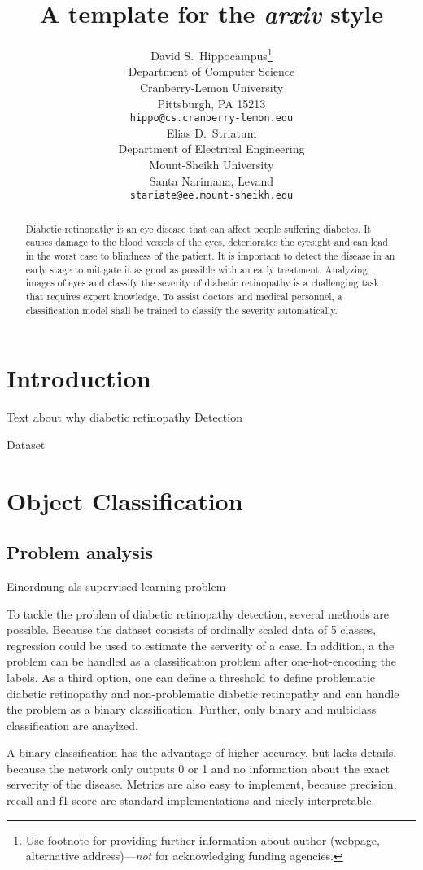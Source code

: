 \documentclass{article}
\title{A template for the \emph{arxiv} style}
\author{
  David S.~Hippocampus\thanks{Use footnote for providing further
    information about author (webpage, alternative
    address)---\emph{not} for acknowledging funding agencies.} \\
  Department of Computer Science\\
  Cranberry-Lemon University\\
  Pittsburgh, PA 15213 \\
  \texttt{hippo@cs.cranberry-lemon.edu} \\
   \And
 Elias D.~Striatum \\
  Department of Electrical Engineering\\
  Mount-Sheikh University\\
  Santa Narimana, Levand \\
  \texttt{stariate@ee.mount-sheikh.edu} \\
}
\begin{document}
\maketitle

\begin{abstract}
Diabetic retinopathy is an eye disease that can affect people suffering diabetes. It causes damage to the blood vessels of 
the eyes, deteriorates the eyesight and can lead in the worst case to blindness of the patient. It is important to 
detect the disease in an early stage to mitigate it as good as possible with an early treatment. Analyzing images of 
eyes and classify the severity of diabetic retinopathy is a challenging task that requires expert knowledge. To assist 
doctors and medical personnel, a classification model shall be trained to classify the severity automatically. 
\end{abstract}

\section{Introduction}
Text about why diabetic retinopathy Detection

Dataset
\section{Object Classification}
\subsection{Problem analysis}
Einordnung als supervised learning problem

To tackle the problem of diabetic retinopathy detection, several methods are possible. Because the dataset consists of 
ordinally scaled data of 5 classes, regression could be used to estimate the serverity of a case. In addition, a the problem 
can be handled as a classification problem after one-hot-encoding the labels. As a third option, one can define a threshold 
to define problematic diabetic retinopathy and non-problematic diabetic retinopathy and can handle the problem as a binary 
classification. Further, only binary and multiclass classification are anaylzed.

A binary classification has the advantage of higher accuracy, but lacks details, because the network only outputs 0 or 1
and no information about the exact serverity of the disease. Metrics are also easy to implement, because precision, 
recall and f1-score are standard implementations and nicely interpretable.
\end{document}
